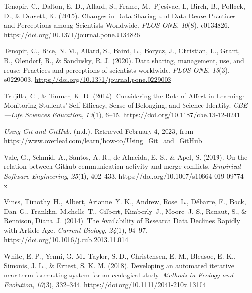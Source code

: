\begin{CSLReferences}{1}{0}
\leavevmode{}%
Tenopir, C., Dalton, E. D., Allard, S., Frame, M., Pjesivac, I., Birch, B., Pollock, D., \& Dorsett, K. (2015). Changes in Data Sharing and Data Reuse Practices and Perceptions among Scientists Worldwide. \emph{PLOS ONE}, \emph{10}(8), e0134826. \url{https://doi.org/10.1371/journal.pone.0134826}

\leavevmode{}%
Tenopir, C., Rice, N. M., Allard, S., Baird, L., Borycz, J., Christian, L., Grant, B., Olendorf, R., \& Sandusky, R. J. (2020). Data sharing, management, use, and reuse: Practices and perceptions of scientists worldwide. \emph{PLOS ONE}, \emph{15}(3), e0229003. \url{https://doi.org/10.1371/journal.pone.0229003}

\leavevmode{}%
Trujillo, G., \& Tanner, K. D. (2014). Considering the Role of Affect in Learning: Monitoring Students' Self-Efficacy, Sense of Belonging, and Science Identity. \emph{CBE---Life Sciences Education}, \emph{13}(1), 6--15. \url{https://doi.org/10.1187/cbe.13-12-0241}

\leavevmode{}%
\emph{Using Git and GitHub}. (n.d.). Retrieved February 4, 2023, from \url{https://www.overleaf.com/learn/how-to/Using_Git_and_GitHub}

\leavevmode{}%
Vale, G., Schmid, A., Santos, A. R., de Almeida, E. S., \& Apel, S. (2019). On the relation between Github communication activity and merge conflicts. \emph{Empirical Software Engineering}, \emph{25}(1), 402--433. \url{https://doi.org/10.1007/s10664-019-09774-x}

\leavevmode{}%
Vines, Timothy~H., Albert, Arianne~Y. K., Andrew, Rose~L., Débarre, F., Bock, Dan~G., Franklin, Michelle~T., Gilbert, Kimberly~J., Moore, J.-S., Renaut, S., \& Rennison, Diana~J. (2014). The Availability of Research Data Declines Rapidly with Article Age. \emph{Current Biology}, \emph{24}(1), 94--97. \url{https://doi.org/10.1016/j.cub.2013.11.014}

\leavevmode{}%
White, E. P., Yenni, G. M., Taylor, S. D., Christensen, E. M., Bledsoe, E. K., Simonis, J. L., \& Ernest, S. K. M. (2018). Developing an automated iterative near‐term forecasting system for an ecological study. \emph{Methods in Ecology and Evolution}, \emph{10}(3), 332--344. \url{https://doi.org/10.1111/2041-210x.13104}


\end{CSLReferences}
